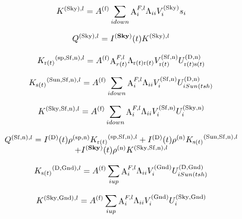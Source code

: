 \begin{equation}
{K^{{\rm{(Sky), }}l}} = {A^{{\rm{(f)}}}}\sum\limits_{i{\rm{ }}down} {{\mathop{\rm A}\nolimits}_i^{F,l}{\Lambda_{ii}}V_i^{{\rm{(Sky)}}}{s_i}}
\end{equation}

\begin{equation}
{Q^{{\rm{(Sky), }}l}} = {I^{({\bf{Sky}})}}(t){K^{{\rm{(Sky), }}l}}
\end{equation}

\begin{equation}
{K_{{\rm{r(}}t{\rm{)}}}}^{{\rm{(sp, Sf, n)}},l} = {A^{{\rm{(f)}}}}{\mathop{\rm A}\nolimits}_{r(t)}^{F,l}{\Lambda_{{\rm{ r(}}t{\rm{) r(}}t{\rm{)}}}}V_{{\rm{ r(}}t{\rm{)}}}^{{\rm{(Sf, n)}}}U_{{\rm{ r(}}t{\rm{) s(}}t{\rm{)}}}^{{\rm{(D,n)}}}
\end{equation}

\begin{equation}
{K_{{\rm{s(}}t{\rm{)}}}}^{{\rm{(Sun, Sf, n)}},l} = {A^{{\rm{(f)}}}}\sum\limits_{i{\rm{ }}down} {{\mathop{\rm A}\nolimits}_i^{F,l}{\Lambda_{ii}}V_i^{{\rm{(Sf, n)}}}U_{i{\rm{ }}Sun(tsh)}^{{\rm{(D,n)}}}}
\end{equation}

\begin{equation}
{K^{{\rm{(Sky, Sf, n)}},l}} = {A^{{\rm{(f)}}}}\sum\limits_{i{\rm{ }}down} {{\mathop{\rm A}\nolimits}_i^{F,l}{\Lambda_{ii}}V_i^{{\rm{(Sf, n)}}}U_i^{{\rm{(Sky, n)}}}}
\end{equation}

\begin{equation}
\begin{array}{c}{Q^{{\rm{(Sf,n)}},l}} = {I^{{\rm{(D)}}}}(t){\rho ^{{\rm{(sp, n)}}}}{K_{{\rm{r(}}t{\rm{)}}}}^{{\rm{(sp, Sf, n)}},l} + {I^{{\rm{(D)}}}}(t){\rho ^{{\rm{(n)}}}}{K_{{\rm{s(}}t{\rm{)}}}}^{{\rm{(Sun, Sf, n)}},l}\\ + {I^{({\bf{Sky}})}}(t){\rho ^{{\rm{(n)}}}}{K^{{\rm{(Sky, Sf, n)}},l}}\end{array}
\end{equation}

\begin{equation}
{K_{{\rm{s(}}t{\rm{)}}}}^{{\rm{(D, Gnd)}},l} = {A^{{\rm{(f)}}}}\sum\limits_{i{\rm{ }}up} {{\mathop{\rm A}\nolimits}_i^{F,l}{\Lambda_{ii}}V_i^{{\rm{(Gnd)}}}U_{i{\rm{ }}Sun(tsh)}^{{\rm{(D, Gnd)}}}}
\end{equation}

\begin{equation}
{K^{{\rm{(Sky, Gnd)}},l}} = {A^{{\rm{(f)}}}}\sum\limits_{i{\rm{ }}up} {{\mathop{\rm A}\nolimits}_i^{F,l}{\Lambda_{ii}}V_i^{{\rm{(Gnd)}}}U_i^{{\rm{(Sky, Gnd)}}}}
\end{equation}

